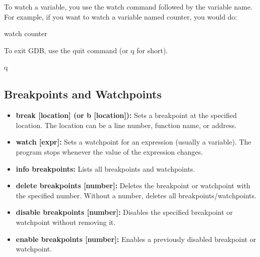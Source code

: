 \documentclass{report}
\begin{document}
     \bigbreak \noindent 
     \bigbreak \noindent 
     To watch a variable, you use the watch command followed by the variable name. For example, if you want to watch a variable named counter, you would do:
     \bigbreak \noindent 
     \begin{bashcode}
     watch counter
     \end{bashcode}


     \bigbreak \noindent 
     To exit GDB, use the quit command (or q for short).
     \bigbreak \noindent 
     \begin{bashcode}
     q
     \end{bashcode}

     \bigbreak \noindent 
     \bigbreak \noindent 
     \subsection{Breakpoints and Watchpoints}
     \begin{itemize}
         \item \textbf{break [location] (or b [location]):} Sets a breakpoint at the specified location. The location can be a line number, function name, or address.
         \item \textbf{watch [expr]:} Sets a watchpoint for an expression (usually a variable). The program stops whenever the value of the expression changes.
         \item \textbf{info breakpoints:} Lists all breakpoints and watchpoints.
         \item \textbf{delete breakpoints [number]:} Deletes the breakpoint or watchpoint with the specified number. Without a number, deletes all breakpoints/watchpoints.
         \item \textbf{disable breakpoints [number]:} Disables the specified breakpoint or watchpoint without removing it.
         \item \textbf{enable breakpoints [number]:} Enables a previously disabled breakpoint or watchpoint.
     \end{itemize}
     \bigbreak \noindent 
\end{document}
